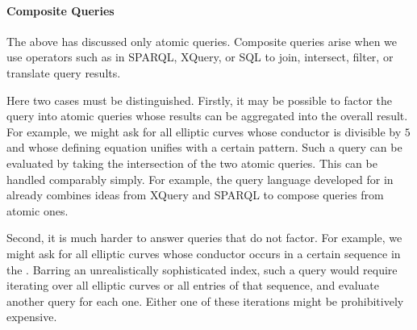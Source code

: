 \paragraph{Composite Queries}
The above has discussed only atomic queries.
Composite queries arise when we use operators such as in SPARQL, XQuery, or SQL to join, intersect, filter, or translate query results.

Here two cases must be distinguished.
Firstly, it may be possible to factor the query into atomic queries whose results can be aggregated into the overall result.
For example, we might ask for all elliptic curves whose conductor is divisible by $5$ and whose defining equation unifies with a certain pattern.
Such a query can be evaluated by taking the intersection of the two atomic queries.
This can be handled comparably simply.
For example, the query language developed for \MMT in \cite{Rabe:qlfml12} already combines ideas from XQuery and SPARQL to compose queries from atomic ones.


Second, it is much harder to answer queries that do not factor.
For example, we might ask for all elliptic curves whose conductor occurs in a certain sequence in the \OEIS.
Barring an unrealistically sophisticated index, such a query would require iterating over all elliptic curves or all entries of that sequence, and evaluate another query for each one.
Either one of these iterations might be prohibitively expensive.

